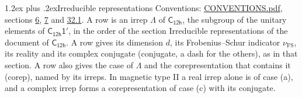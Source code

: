 \documentclass[10pt,a4paper]{article}
\makeatletter
\renewcommand\section{\@startsection{section}{1}{\z@}{-3ex plus -1ex minus -.2ex}%
  {1.2ex plus .2ex}{\normalfont\large\sffamily\bfseries\color{parttitle}}}
\numberwithin{equation}{section}
\newcommand{\grp}[1]{\mathsf{#1}}
\newcommand{\fsind}{\nu_{\mathrm{FS}}}
\makeatother
\begin{document}
\section{Irreducible representations}\label{s:irreps}
Conventions: \href{../../CONVENTIONS.pdf}{CONVENTIONS.pdf}, sections \href{../../../rotation/CONVENTIONS.pdf\#conv.6}{6}, \href{../../../rotation/CONVENTIONS.pdf\#conv.7}{7} and \href{../../CONVENTIONS.pdf\#conv.32.1}{32.1}.
\leavevmode\label{n:irrep.Delta}A row is an irrep $\Lambda$ of $\grp{C_{12h}}$, the subgroup of the unitary elements of $\grp{C_{12h}1'}$, in the order of the section Irreducible representations of the document of \href{../../../rotation/data/pdf/C12h.pdf}{$\grp{C_{12h}}$}. \label{n:index.dimension}\label{n:index.frobenius}\label{n:head.irrep}\label{n:head.reality}\label{n:head.conjugate}A row gives its dimension $d$, its Frobenius--Schur indicator $\fsind$, its reality and its complex conjugate (conjugate, a dash for the others), as in that section. \label{n:head.case.corep}\label{n:head.corep}A row also gives the case of $\Lambda$ and the corepresentation that contains it (corep), named by its irreps. In magnetic type II a real irrep alone is of case (a), and a complex irrep forms a corepresentation of case (c) with its conjugate.
\setlength{\emergencystretch}{2em}\par\setlength{\emergencystretch}{0pt}
\end{document}
